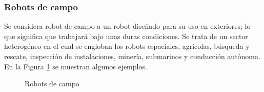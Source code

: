 \subsubsection{Robots de campo}
Se considera robot de campo a un robot diseñado para su uso en exteriores; lo que significa que trabajará bajo unas duras condiciones. 
Se trata de un sector heterogéneo en el cual se engloban los 
robots espaciales, agrícolas, búsqueda y rescate, inspección de instalaciones, minería, submarinos y conducción autónoma. En la Figura \ref{fig:campo} 
se muestran algunos ejemplos.
\begin{figure} [ht!]
  \centering    
  \hspace{3cm}
  \hspace{3cm}
  \hspace{3cm}
  \caption{Robots de campo}
  \label{fig:campo}
\end{figure}

